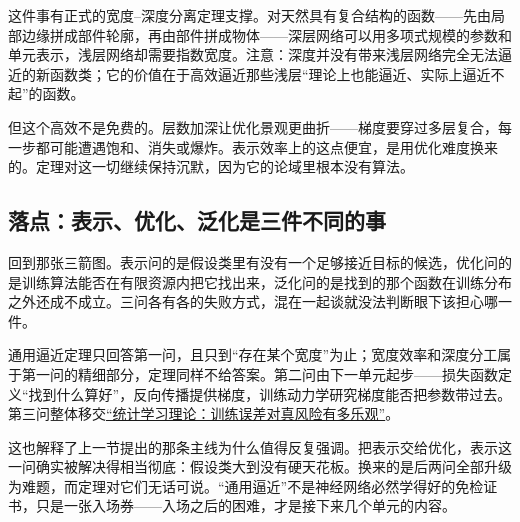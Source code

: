 这件事有正式的宽度--深度分离定理支撑。对天然具有复合结构的函数——先由局部边缘拼成部件轮廓，再由部件拼成物体——深层网络可以用多项式规模的参数和单元表示，浅层网络却需要指数宽度。注意：深度并没有带来浅层网络完全无法逼近的新函数类；它的价值在于高效逼近那些浅层``理论上也能逼近、实际上逼近不起''的函数。

但这个高效不是免费的。层数加深让优化景观更曲折——梯度要穿过多层复合，每一步都可能遭遇饱和、消失或爆炸。表示效率上的这点便宜，是用优化难度换来的。定理对这一切继续保持沉默，因为它的论域里根本没有算法。

\subsection{落点：表示、优化、泛化是三件不同的事}

回到那张三箭图。表示问的是假设类里有没有一个足够接近目标的候选，优化问的是训练算法能否在有限资源内把它找出来，泛化问的是找到的那个函数在训练分布之外还成不成立。三问各有各的失败方式，混在一起谈就没法判断眼下该担心哪一件。

通用逼近定理只回答第一问，且只到``存在某个宽度''为止；宽度效率和深度分工属于第一问的精细部分，定理同样不给答案。第二问由下一单元起步——损失函数定义``找到什么算好''，反向传播提供梯度，训练动力学研究梯度能否把参数带过去。第三问整体移交\hyperref[ch:118]{``统计学习理论：训练误差对真风险有多乐观''}。

这也解释了上一节提出的那条主线为什么值得反复强调。把表示交给优化，表示这一问确实被解决得相当彻底：假设类大到没有硬天花板。换来的是后两问全部升级为难题，而定理对它们无话可说。``通用逼近''不是神经网络必然学得好的免检证书，只是一张入场券——入场之后的困难，才是接下来几个单元的内容。
